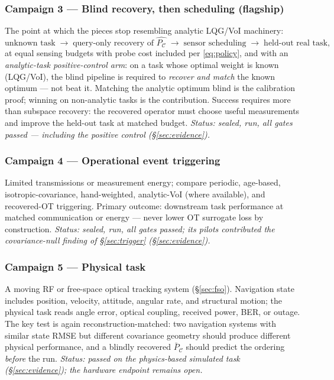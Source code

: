 \documentclass[letterpaper,onecolumn]{IEEEtran}
\theoremstyle{definition}
\theoremstyle{remark}
\newcommand{\PC}{P_{\mathcal{C}}}
\newcommand{\PCb}{\bar P_{\mathcal{C}}}
\begin{document}
\subsubsection*{Campaign 3 --- Blind recovery, then scheduling (flagship)}
The point at which the pieces stop resembling analytic LQG/VoI machinery:
\begin{equation*}
\text{unknown task}\;\to\;\text{query-only recovery of }\widehat{\PC}
\;\to\;\text{sensor scheduling}\;\to\;\text{held-out real task},
\end{equation*}
at equal sensing budgets with probe cost included per \eqref{eq:policy}, and
with an \emph{analytic-task positive-control arm}: on a task whose
optimal weight is known (LQG/VoI), the blind pipeline is required to
\emph{recover and match} the known optimum --- not beat it. Matching the
analytic optimum blind is the calibration proof; winning on non-analytic
tasks is the contribution. Success requires more than subspace recovery:
the recovered operator must choose useful measurements and improve the
held-out task at matched budget.
\emph{Status: sealed, run, all gates passed --- including the positive
control (\S\ref{sec:evidence}).}

\subsubsection*{Campaign 4 --- Operational event triggering}
Limited transmissions or measurement energy; compare periodic, age-based,
isotropic-covariance, hand-weighted, analytic-VoI (where available), and
recovered-OT triggering. Primary outcome: downstream task performance at
matched communication or energy --- never lower OT surrogate loss by
construction.
\emph{Status: sealed, run, all gates passed; its pilots contributed the
covariance-null finding of \S\ref{sec:trigger} (\S\ref{sec:evidence}).}

\subsubsection*{Campaign 5 --- Physical task}
A moving RF or free-space optical tracking system (\S\ref{sec:fso}).
Navigation state includes position, velocity, attitude, angular rate, and
structural motion; the physical task reads angle error, optical coupling,
received power, BER, or outage. The key test is again reconstruction-matched:
two navigation systems with similar state RMSE but different covariance
geometry should produce different physical performance, and a blindly
recovered $\PCb$ should predict the ordering \emph{before} the run.
\emph{Status: passed on the physics-based simulated task
(\S\ref{sec:evidence}); the hardware endpoint remains open.}
\end{document}
